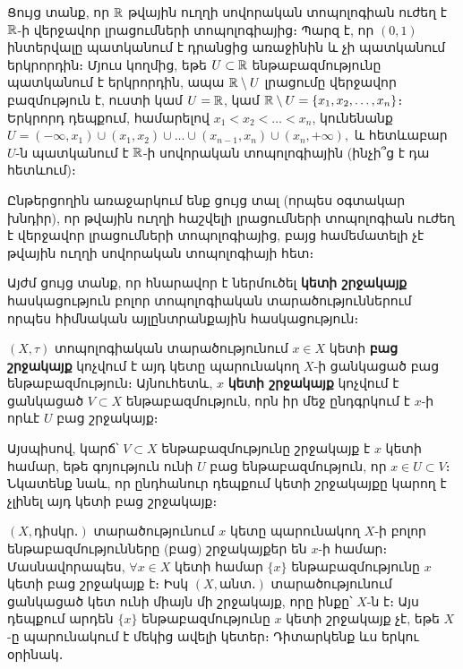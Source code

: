 \documentclass[./main.tex]{subfiles}
\begin{document}
\begin{example}\label{ch4ex7}
Ցույց տանք, որ $\mathbb{R}$ թվային ուղղի սովորական տոպոլոգիան ուժեղ է $\mathbb{R}$-ի վերջավոր լրացումների տոպոլոգիայից։ Պարզ է, որ $(0, 1)$ ինտերվալը պատկա\-նում է դրանցից առաջինին և չի պատկանում երկրորդին։ Մյուս կողմից, եթե \linebreak $U\subset \mathbb{R}$ ենթաբազմությունը պատկանում է երկրորդին, ապա $\mathbb{R} \setminus U$ լրացումը վերջա\-վոր բազմություն է, ուստի կամ $U=\mathbb{R}$, կամ $\mathbb{R} \setminus U=\{x_1,x_2,\dots,x_n\}$։ Երկրորդ դեպքում, համարելով $x_1<x_2<\dots<x_n$, կունենանք $U=(-\infty,x_1) \cup (x_1,x_2)\cup \dots \cup(x_{n-1},x_n) \cup(x_n,+\infty),$ և հետևաբար $U$-ն պատկանում է $\mathbb{R}$-ի սովորական տոպոլո\-գիա\-յին (ինչի՞ց է դա հետևում)։
\par Ընթերցողին առաջարկում ենք ցույց տալ (որպես օգտակար խնդիր), որ թվային ուղղի հաշվելի լրացումների տոպոլոգիան ուժեղ է վերջավոր լրացումների տոպո\-լո\-գիայից, բայց համեմատելի չէ թվային ուղղի սովորական տոպոլոգիայի հետ։
\end{example}

Այժմ ցույց տանք, որ հնարավոր է ներմուծել \textbf{կետի շրջակայք} հասկացություն բոլոր տոպոլոգիական տարածություններում որպես հիմնական այլընտրանքային հասկացություն։

\begin{definition}
$(X, \tau )$ տոպոլոգիական տարածությունում $x\in X$ կետի \textbf{բաց շրջա\-կայք} կոչվում է այդ կետը պարունակող $X$-ի ցանկացած բաց ենթաբազմություն։ Այնուհետև, $x$ \textbf{կետի շրջակայք} կոչվում է ցանկացած $V\subset X$ ենթաբազմու\-թյուն, որն իր մեջ ընդգրկում է $x$-ի որևէ $U$ բաց շրջակայք։
\par Այսպիսով, կարճ՝ $V\subset X$ ենթաբազմությունը շրջակայք է $x$ կետի համար, եթե գոյություն ունի $U$ բաց ենթաբազմություն, որ $x\in U\subset V$։ Նկատենք նաև, որ ընդհանուր դեպքում կետի շրջակայքը կարող է չլինել այդ կետի բաց շրջակայք։
\end{definition}
\begin{example}\label{ch4ex8}
$(X, \textrm{դիսկր․})$ տարածությունում $x$ կետը պարունակող $X$-ի բոլոր ենթա\-բազմութ\-յուն\-ները (բաց) շրջակայքեր են $x$-ի համար։ Մասնավորապես, $\forall x \in X$ կետի համար $\{x\}$ ենթաբազմությունը $x$ կետի բաց շրջակայք է։ Իսկ $(X, \textrm{անտ․})$ տարածությունում ցանկացած կետ ունի միայն մի շրջակայք, որը ինքը՝ $X$-ն է։ Այս դեպքում արդեն $\{x\}$ ենթաբազմությունը $x$ կետի շրջակայք չէ, եթե $X$-ը պարու\-նա\-կում է մեկից ավելի կետեր։ Դիտարկենք ևս երկու օրինակ․
\end{example}
\end{document}
